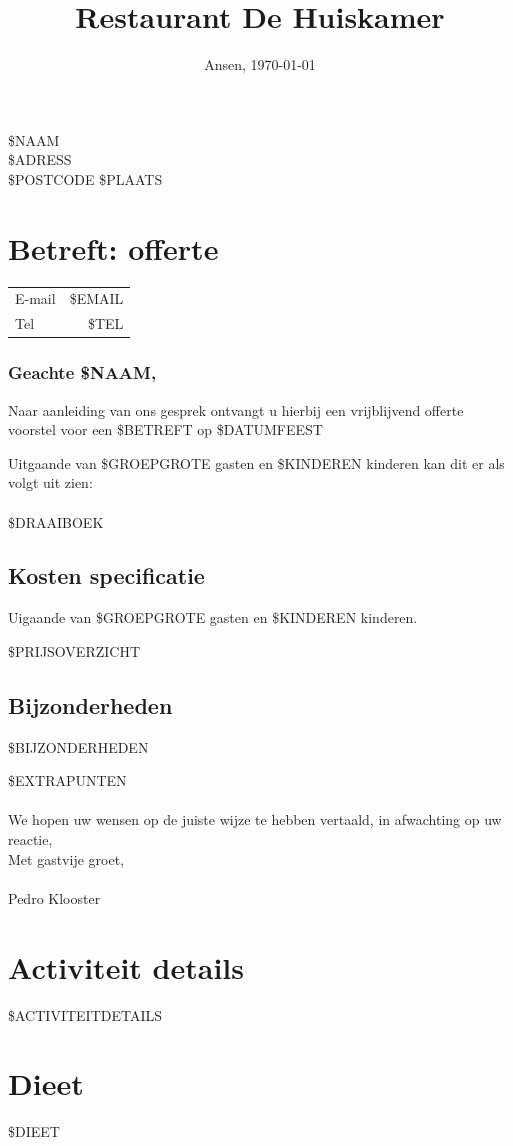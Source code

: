 \documentclass{scrartcl}
\begin{document}

\title{Restaurant De Huiskamer}
\date{Ansen, \today}
\maketitle
\thispagestyle{empty}

\begin{flushright}
	\$NAAM \\
	\$ADRESS \\
	\$POSTCODE \$PLAATS
\end{flushright}
\section*{Betreft: offerte}
\begin{tabular}{l r}
  E-mail & \$EMAIL  \\
  Tel & \$TEL  \\
\end{tabular}

\subsubsection*{Geachte \$NAAM,}

Naar aanleiding van ons gesprek ontvangt u hierbij een vrijblijvend offerte voorstel
voor een \$BETREFT op \$DATUMFEEST

Uitgaande van \$GROEPGROTE gasten en \$KINDEREN kinderen kan dit er als volgt uit zien: \\\\
\$DRAAIBOEK

\newpage

\subsection*{Kosten specificatie}
Uigaande van \$GROEPGROTE gasten en \$KINDEREN kinderen.

\$PRIJSOVERZICHT

\subsection*{Bijzonderheden}

\$BIJZONDERHEDEN

\$EXTRAPUNTEN \\\\

We hopen uw wensen op de juiste wijze te hebben vertaald, in afwachting op uw reactie, \\

Met gastvije groet, \\\\

Pedro Klooster

\newpage

\section*{Activiteit details}

\$ACTIVITEITDETAILS

\section*{Dieet}

\$DIEET
\end{document}
